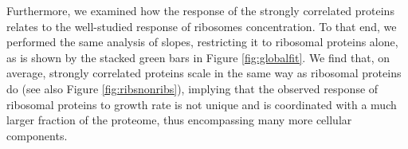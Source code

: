 Furthermore, we examined how the response of the strongly correlated proteins relates to the well-studied response of ribosomes concentration.
To that end, we performed the same analysis of slopes, restricting it to ribosomal proteins alone, as is shown by the stacked green bars in Figure \ref{fig:globalfit}.
We find that, on average, strongly correlated proteins scale in the same way as ribosomal proteins do (see also Figure \ref{fig:ribsnonribs}), implying that the observed response of ribosomal proteins to growth rate is not unique and is coordinated with a much larger fraction of the proteome, thus encompassing many more cellular components.
\begin{comment}
\emph{ToDo: literature survey on mechanisms suggested to control ribosomes concentration to check whether they are for RNA to protein coordination, rRNA to mRNA control, or ribosomal protein control, with our findings highlighting questions on the last ones}.
\end{comment}